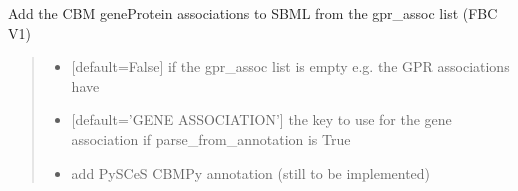 \documentclass[letterpaper,12pt,english]{sphinxmanual}
\begin{document}
\begin{fulllineitems}
\begin{fulllineitems}
\begin{quote}
\begin{description}
\end{description}\end{quote}

\end{fulllineitems}


\begin{fulllineitems}
\label{\detokenize{api/io:cbmpy.CBXML.CBMtoSBML3.addGeneProteinAssociationsV1}}
\pysigstartsignatures
\pysiglinewithargsret
{}
{\sphinxparamcomma {}\sphinxparamcomma {}}
{}
\pysigstopsignatures
\sphinxAtStartPar
Add the CBM geneProtein associations to SBML from the gpr\_assoc list (FBC V1)
\begin{quote}\begin{description}
\begin{itemize}
\item {} 
\sphinxAtStartPar
{} \textendash{} {[}default=False{]} if the gpr\_assoc list is empty e.g. the GPR associations have

\item {} 
\sphinxAtStartPar
{} \textendash{} {[}default=’GENE ASSOCIATION’{]} the key to use for the gene association if parse\_from\_annotation is True

\item {} 
\sphinxAtStartPar
{} \textendash{} add PySCeS CBMPy annotation (still to be implemented)

\end{itemize}

\end{description}\end{quote}

\end{fulllineitems}



\end{fulllineitems}
\end{document}
